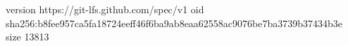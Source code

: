 version https://git-lfs.github.com/spec/v1
oid sha256:b8fee957ca5fa18724eeff46f6ba9ab8eaa62558ac9076be7ba3739b37434b3e
size 13813
